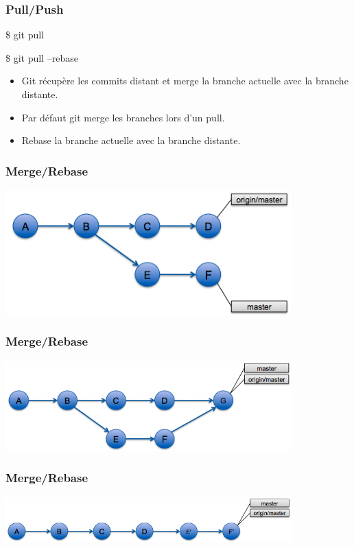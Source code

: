 \documentclass{beamer}
\begin{document}
\begin{frame}
  \frametitle{Pull/Push}
  \begin{semiverbatim}
    \$ git pull

    \$ git pull --rebase
  \end{semiverbatim}
  \begin{itemize}
  \item Git récupère les commits distant et merge la branche actuelle avec la branche distante.
  \item Par défaut git merge les branches lors d'un pull.
  \item Rebase la branche actuelle avec la branche distante.
  \end{itemize}
\end{frame}

\begin{frame}
\frametitle{Merge/Rebase}
    \begin{center}
     \includegraphics[width=11cm]{imgs/before-merge.png}
     \end{center}
\end{frame}

\begin{frame}
\frametitle{Merge/Rebase}
    \begin{center}
     \includegraphics[width=11cm]{imgs/git-merge2.png}
     \end{center}
\end{frame}

\begin{frame}
\frametitle{Merge/Rebase}
    \begin{center}
     \includegraphics[width=11cm]{imgs/git-rebase.png}
     \end{center}
\end{frame}
\end{document}
